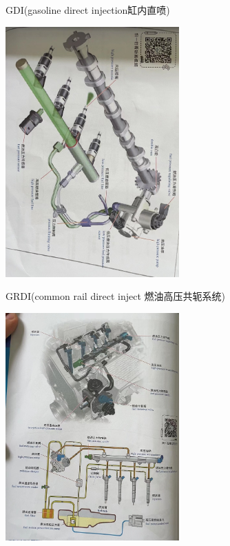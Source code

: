 \begin{frame}
	\begin{block}{GDI(gasoline direct injection缸内直喷)}
		\begin{center}
			\includegraphics[angle=90,width=0.5\textwidth]{2-23}
		\end{center}
	\end{block}
\end{frame}
\begin{frame}
	\begin{block}{GRDI(common rail direct inject 燃油高压共轭系统)}
		\begin{center}
			\includegraphics[width=0.5\textwidth]{2-24}
		\end{center}
	\end{block}
\end{frame}
